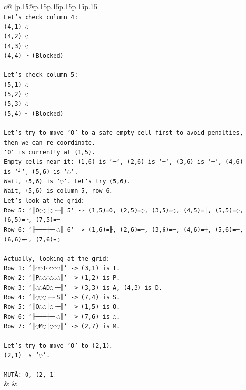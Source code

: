 \documentclass{article}
\begin{document}
{\begin{supertabular}{c@{$\;$}|p{.15\linewidth}@{}p{.15\linewidth}p{.15\linewidth}p{.15\linewidth}p{.15\linewidth}p{.15\linewidth}}
{{{\\ 
\texttt{Let's check column 4:} \\
\texttt{(4,1) ◌} \\
\texttt{(4,2) ◌} \\
\texttt{(4,3) ◌} \\
\texttt{(4,4) ┌ (Blocked)} \\
\\ 
\texttt{Let's check column 5:} \\
\texttt{(5,1) ◌} \\
\texttt{(5,2) ◌} \\
\texttt{(5,3) ◌} \\
\texttt{(5,4) ┤ (Blocked)} \\
\\ 
\texttt{Let's try to move 'O' to a safe empty cell first to avoid penalties, then we can re{-}coordinate.} \\
\texttt{'O' is currently at (1,5).} \\
\texttt{Empty cells near it: (1,6) is `─`, (2,6) is `─`, (3,6) is `─`, (4,6) is `┘`, (5,6) is `◌`.} \\
\texttt{Wait, (5,6) is `◌`. Let's try (5,6).} \\
\texttt{Wait, (5,6) is column 5, row 6.} \\
\texttt{Let's look at the grid:} \\
\texttt{Row 5: `║O◌◌│◌├─╢ 5` {-}> (1,5)=O, (2,5)=◌, (3,5)=◌, (4,5)=│, (5,5)=◌, (6,5)=├, (7,5)=─} \\
\texttt{Row 6: `╟───┼─┘◌║ 6` {-}> (1,6)=╟, (2,6)=─, (3,6)=─, (4,6)=┼, (5,6)=─, (6,6)=┘, (7,6)=◌} \\
\\ 
\texttt{Actually, looking at the grid:} \\
\texttt{Row 1: `║◌◌T◌◌◌◌║` {-}> (3,1) is T.} \\
\texttt{Row 2: `║P◌◌◌◌◌◌║` {-}> (1,2) is P.} \\
\texttt{Row 3: `║◌◌AD◌┌─╢` {-}> (3,3) is A, (4,3) is D.} \\
\texttt{Row 4: `║◌◌◌┌─┤S║` {-}> (7,4) is S.} \\
\texttt{Row 5: `║O◌◌│◌├─╢` {-}> (1,5) is O.} \\
\texttt{Row 6: `╟───┼─┘◌║` {-}> (7,6) is ◌.} \\
\texttt{Row 7: `║◌M◌│◌◌◌║` {-}> (2,7) is M.} \\
\\ 
\texttt{Let's try to move 'O' to (2,1).} \\
\texttt{(2,1) is `◌`.} \\
\\ 
\texttt{MUTĂ: O, (2, 1)} \\
            }
        }
    }
    & & \\ \\


\end{supertabular}}
\end{document}
